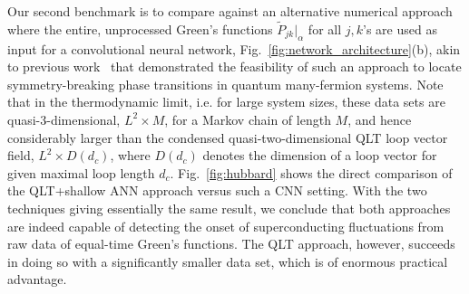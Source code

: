 \documentclass[amsmath,amssymb, aps, prx, longbibliography, twocolumn]{revtex4-1}
\begin{document}
%
Our second benchmark is to compare against an alternative numerical approach where the entire, unprocessed Green's functions 
$\widetilde{P}_{jk}|_{\alpha}$ for all $j,k$'s are used as input for a convolutional neural network, Fig.~\ref{fig:network_architecture}(b), akin to previous work~\cite{Simon2016} that demonstrated the feasibility of such an approach to  locate symmetry-breaking phase transitions in quantum many-fermion systems. Note that in the thermodynamic limit, i.e. for large system sizes, these data sets are quasi-3-dimensional, $L^2 \times M$, for a Markov chain of length $M$, and hence considerably larger than the condensed quasi-two-dimensional QLT loop vector field, $L^2 \times D(d_c)$, where $D(d_c)$ denotes the dimension of a loop vector for given maximal loop length $d_c$.
Fig.~\ref{fig:hubbard} shows the direct comparison of the QLT+shallow ANN approach versus such a CNN setting. With the two techniques giving essentially the same result, we conclude that  both approaches are indeed capable of detecting the onset of superconducting fluctuations from raw data of equal-time Green's functions. The QLT approach, however, succeeds in doing so with a significantly smaller data set, which is of enormous practical advantage.
\end{document}
